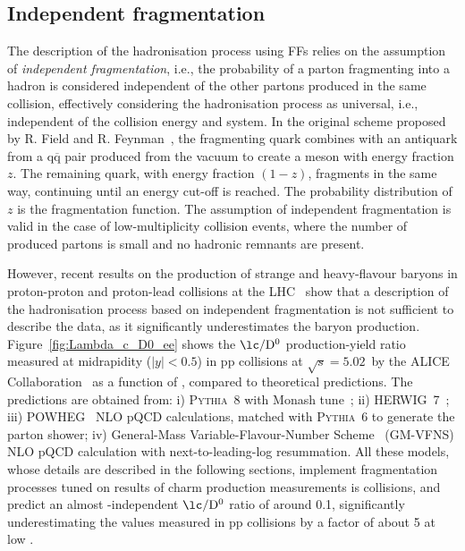 \subsection{Independent fragmentation}\label{sec:independent_fragmentation}
The description of the hadronisation process using FFs relies on the assumption of \emph{independent fragmentation}, i.e., the probability of a parton fragmenting into a hadron is considered independent of the other partons produced in the same collision, effectively considering the hadronisation process as universal, i.e., independent of the collision energy and system. In the original scheme proposed by R. Field and R. Feynman~\cite{Field:1976ve}, the fragmenting quark combines with an antiquark from a $\mathrm{q\overline{q}}$ pair produced from the vacuum to create a meson with energy fraction $z$. The remaining quark, with energy fraction $(1-z)$, fragments in the same way, continuing until an energy cut-off is reached. The probability distribution of $z$ is the fragmentation function. The assumption of independent fragmentation is valid in the case of low-multiplicity \ee collision events, where the number of produced partons is small and no hadronic remnants are present.

However, recent results on the production of strange and heavy-flavour baryons in proton-proton and proton-lead collisions at the LHC~\cite{ALICE:2020wla,ALICE:2024ozd} show that a description of the hadronisation process based on independent fragmentation is not sufficient to describe the data, as it significantly underestimates the baryon production. Figure~\ref{fig:Lambda_c_D0_ee} shows the $\mathrm{\lc/D^0}$ production-yield ratio measured at midrapidity ($\lvert y\rvert<0.5$) in pp collisions at $\sqrt{s} = 5.02$~\tev by the ALICE Collaboration~\cite{ALICE:2020wla} as a function of \pt, compared to theoretical predictions. The predictions are obtained from: i) \textsc{Pythia}~8 with Monash tune~\cite{Skands:2014pea}; ii) HERWIG~7~\cite{Bellm:2015jjp}; iii) POWHEG~\cite{Frixione:2007nw} NLO pQCD calculations, matched with \textsc{Pythia}~6 to generate the parton shower; iv) General-Mass Variable-Flavour-Number Scheme~\cite{Kniehl:2005mk} (GM-VFNS) NLO pQCD calculation with next-to-leading-log resummation. All these models, whose details are described in the following sections, implement fragmentation processes tuned on results of charm production measurements is \ee collisions, and predict an almost \pt-independent $\mathrm{\lc/D^0}$ ratio of around 0.1, significantly underestimating the values measured in pp collisions by a factor of about 5 at low \pt.

